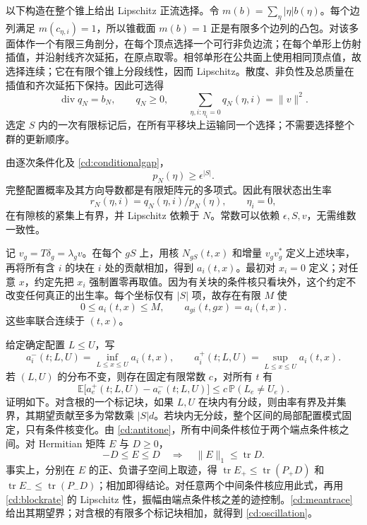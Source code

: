 \documentclass[UTF8,zihao=-4,a4paper]{ctexart}
\numberwithin{equation}{section}
\begin{document}
以下构造在整个锥上给出 Lipschitz 正流选择。令
$m(b)=\sum_\eta|\eta|b(\eta)$。每个边列满足 $m(c_{\eta,i})=1$，所以锥截面 $m(b)=1$ 正是有限多个边列的凸包。对该多面体作一个有限三角剖分，在每个顶点选择一个可行非负边流；在每个单形上仿射插值，并沿射线齐次延拓，在原点取零。相邻单形在公共面上使用相同顶点值，故选择连续；它在有限个锥上分段线性，因而 Lipschitz。散度、非负性及总质量在插值和齐次延拓下保持。因此可选得
\begin{equation}
\operatorname{div}q_N=b_N,\qquad q_N\ge0,
\qquad \sum_{\eta,i:\eta_i=0}q_N(\eta,i)=\|v\|^2.
\label{cd:flow}
\end{equation}
选定 $S$ 内的一次有限标记后，在所有平移块上运输同一个选择；不需要选择整个群的更新顺序。

由逐次条件化及 \eqref{cd:conditionalgap}，
\begin{equation}
p_N(\eta)\ge\epsilon^{|S|}.
\label{cd:pointlower}
\end{equation}
完整配置概率及其方向导数都是有限矩阵元的多项式。因此有限状态出生率
\begin{equation}
r_N(\eta,i)=q_N(\eta,i)/p_N(\eta),\qquad \eta_i=0,
\label{cd:blockrate}
\end{equation}
在有隙核的紧集上有界，并 Lipschitz 依赖于 $N$。常数可以依赖 $\epsilon,S,v$，无需维数一致性。

记 $v_g=T\delta_g=\lambda_gv$。在每个 $gS$ 上，用核
$N_{gS}(t,x)$ 和增量 $v_gv_g^*$ 定义上述块率，再将所有含 $i$ 的块在 $i$ 处的贡献相加，得到 $a_i(t,x)$。最初对 $x_i=0$ 定义；对任意 $x$，约定先把 $x_i$ 强制置零再取值。因为有关块的条件核只看块外，这个约定不改变任何真正的出生率。每个坐标仅有 $|S|$ 项，故存在有限 $M$ 使
\[
0\le a_i(t,x)\le M,
\qquad a_{gi}(t,gx)=a_i(t,x).
\]
这些率联合连续于 $(t,x)$。

给定确定配置 $L\le U$，写
\[
a_i^-(t;L,U)=\inf_{L\le x\le U}a_i(t,x),\qquad
a_i^+(t;L,U)=\sup_{L\le x\le U}a_i(t,x).
\]
若 $(L,U)$ 的分布不变，则存在固定有限常数 $c$，对所有 $t$ 有
\begin{equation}
\mathbb E\bigl[a_e^+(t;L,U)-a_e^-(t;L,U)\bigr]
\le c\,\mathbb P(L_e\ne U_e).
\label{cd:oscillation}
\end{equation}
证明如下。对含根的一个标记块，如果 $L,U$ 在块内有分歧，则由率有界及并集界，其期望贡献至多为常数乘 $|S|d$。若块内无分歧，整个区间的局部配置模式固定，只有条件核变化。由 \eqref{cd:antitone}，所有中间条件核位于两个端点条件核之间。对 Hermitian 矩阵 $E$ 与 $D\ge0$，
\begin{equation}
-D\le E\le D\quad\Longrightarrow\quad
\|E\|_1\le\operatorname{tr}D.
\label{cd:matrixinterval}
\end{equation}
事实上，分别在 $E$ 的正、负谱子空间上取迹，得
$\operatorname{tr}E_+\le\operatorname{tr}(P_+D)$ 和
$\operatorname{tr}E_-\le\operatorname{tr}(P_-D)$；相加即得结论。对任意两个中间条件核应用此式，再用 \eqref{cd:blockrate} 的 Lipschitz 性，振幅由端点条件核之差的迹控制。\eqref{cd:meantrace} 给出其期望界；对含根的有限多个标记块相加，就得到 \eqref{cd:oscillation}。
\end{document}
